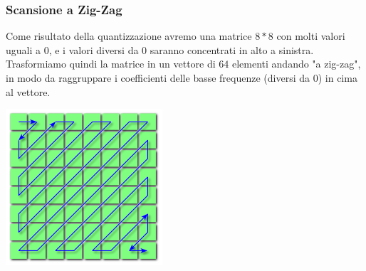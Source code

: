 \documentclass[a4paper,11pt]{article} %
\begin{document}
\subsubsection{Scansione a Zig-Zag}
\begin{minipage}{0.7\textwidth}
Come risultato della quantizzazione avremo una matrice $8*8$ con molti valori uguali a 0, e i valori diversi da 0 saranno concentrati in alto a sinistra. Trasformiamo quindi la matrice in un vettore di $64$ elementi andando "a zig-zag", in modo da raggruppare i coefficienti delle basse frequenze (diversi da 0) in cima al vettore.
\end{minipage}
\hspace{0.1\textwidth}
\begin{minipage}{0.2\textwidth}
\centering
    \includegraphics[width=\linewidth]{ZigZag scan.png}
\end{minipage}
\\
\end{document}
